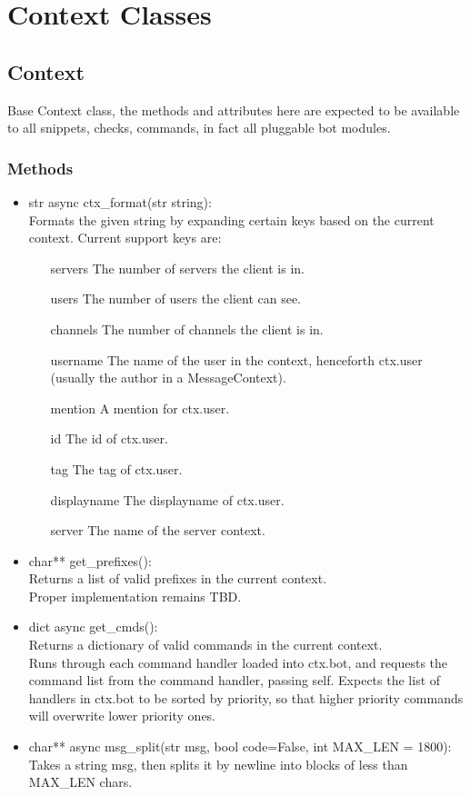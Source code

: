 \documentclass[a4paper]{amsart}
\begin{document}
\section{Context Classes}
\subsection{Context}
Base Context class, the methods and attributes here are expected to be available to all snippets, checks, commands, in fact all pluggable bot modules.
\subsubsection{Methods}
\begin{itemize}
    \item {str async ctx\_format(str string)}:\\
        Formats the given string by expanding certain keys based on the current context. Current support keys are:
        \begin{itemize}
            \item[servers] The number of servers the client is in.
            \item[users] The number of users the client can see.
            \item[channels] The number of channels the client is in.
            \item[username] The name of the user in the context, henceforth ctx.user (usually the author in a MessageContext).
            \item[mention] A mention for ctx.user.
            \item[id] The id of ctx.user.
            \item[tag] The tag of ctx.user.
            \item[displayname] The displayname of ctx.user.
            \item[server] The name of the server context.
        \end{itemize}
    \item {char** get\_prefixes()}:\\
        Returns a list of valid prefixes in the current context. \\
        Proper implementation remains TBD.
    \item {dict async get\_cmds()}:\\
        Returns a dictionary of valid commands in the current context.\\
        Runs through each command handler loaded into ctx.bot, and requests the command list from the command handler, passing {self}.
        Expects the list of handlers in ctx.bot to be sorted by priority, so that higher priority commands will overwrite lower priority ones.
    \item {char** async msg\_split(str msg, bool code=False, int MAX\_LEN = 1800)}:\\
        Takes a string {msg}, then splits it by newline into blocks of less than {MAX\_LEN} chars.

\end{itemize}
\end{document}
